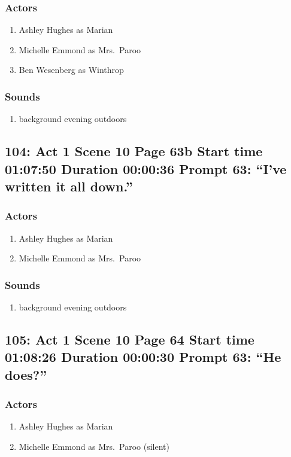 \subsubsection{Actors}
\begin{enumerate}
\item Ashley Hughes as Marian
\item Michelle Emmond as Mrs.~Paroo
\item Ben Wesenberg as Winthrop
\end{enumerate}

\subsubsection{Sounds}
\begin{enumerate}
\item background evening outdoors
\end{enumerate}
\subsection{104: Act 1 Scene 10 Page 63b Start time 01:07:50 Duration 00:00:36 Prompt 63: ``I've written it all down.''}

\subsubsection{Actors}
\begin{enumerate}
\item Ashley Hughes as Marian
\item Michelle Emmond as Mrs.~Paroo
\end{enumerate}

\subsubsection{Sounds}
\begin{enumerate}
\item background evening outdoors
\end{enumerate}
\subsection{105: Act 1 Scene 10 Page 64 Start time 01:08:26 Duration 00:00:30 Prompt 63: ``He does?''}

\subsubsection{Actors}
\begin{enumerate}
\item Ashley Hughes as Marian
\item Michelle Emmond as Mrs.~Paroo (silent)
\end{enumerate}


